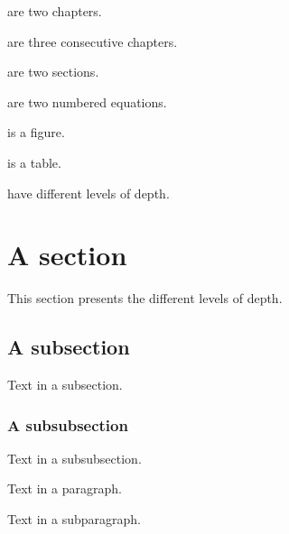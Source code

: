  are two chapters.

 are three consecutive chapters.

 are two sections.

 are two numbered equations.

 is a figure.

 is a table.

 have different levels of depth.

\section{A section}
\label{sec:a-section}

This section presents the different levels of depth.

\subsection{A subsection}
\label{ssec:a-subsection}

Text in a subsection.

\subsubsection{A subsubsection}

Text in a subsubsection.


Text in a paragraph.


Text in a subparagraph.
